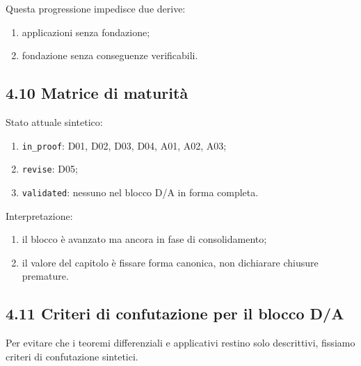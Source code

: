 Questa progressione impedisce due derive:

\begin{enumerate}
\def\labelenumi{\arabic{enumi}.}
\tightlist
\item
  applicazioni senza fondazione;
\item
  fondazione senza conseguenze verificabili.
\end{enumerate}

\subsection{4.10 Matrice di maturità}

Stato attuale sintetico:

\begin{enumerate}
\def\labelenumi{\arabic{enumi}.}
\tightlist
\item
  \texttt{in\_proof}: D01, D02, D03, D04, A01, A02, A03;
\item
  \texttt{revise}: D05;
\item
  \texttt{validated}: nessuno nel blocco D/A in forma completa.
\end{enumerate}

Interpretazione:

\begin{enumerate}
\def\labelenumi{\arabic{enumi}.}
\tightlist
\item
  il blocco è avanzato ma ancora in fase di consolidamento;
\item
  il valore del capitolo è fissare forma canonica, non dichiarare chiusure premature.
\end{enumerate}

\subsection{4.11 Criteri di confutazione per il blocco D/A}

Per evitare che i teoremi differenziali e applicativi restino solo descrittivi, fissiamo criteri di confutazione sintetici.

